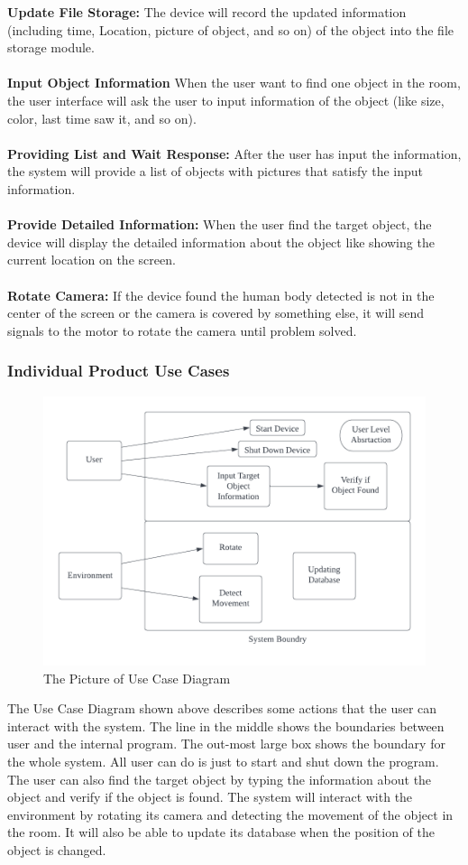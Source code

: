 \documentclass[12pt]{article}
\begin{document}
\textbf{Update File Storage:} The device will record the updated information (including time, Location, picture of object, and so on) of the object into the file storage module.\\\\
\textbf{Input Object Information} When the user want to find one object in the room, the user interface will ask the user to input information of the object (like size, color, last time saw it, and so on).\\\\
\textbf{Providing List and Wait Response:} After the user has input the information, the system will provide a list of objects with pictures that satisfy the input information.\\\\
\textbf{Provide Detailed Information:} When the user find the target object, the device will display the detailed information about the object like showing the current location on the screen. \\\\
\textbf{Rotate Camera:} If the device found the human body detected is not in the center of the screen or the camera is covered by something else, it will send signals to the motor to rotate the camera until problem solved. 


\subsubsection{Individual Product Use Cases}
\begin{figure}[H]
    \centering
    \includegraphics[scale=0.8]{Use.png}
    \caption{The Picture of Use Case Diagram}
\end{figure}
The Use Case Diagram shown above describes some actions that the user can interact with the system. The line in the middle shows the boundaries between user and the internal program. The out-most large box shows the boundary for the whole system. All user can do is just to start and shut down the program. The user can also find the target object by typing the information about the object and verify if the object is found. The system will interact with the environment by rotating its camera and detecting the movement of the object in the room. It will also be able to update its database when the position of the object is changed. 
\end{document}
